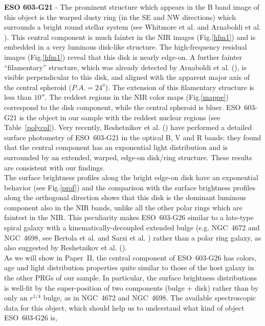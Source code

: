 \documentclass{aa}
\begin{document}
{\bf ESO 603-G21} -
The prominent structure which appears in the B band image of this object 
is the warped dusty ring (in the SE and NW directions) which
surrounds a bright round stellar system (see Whitmore et al. \cite{PRC} and
Arnaboldi et al. \cite{magda95}). 
This central component is much fainter in the NIR images (Fig.\ref{hfm1}) and 
is embedded in a very luminous disk-like structure. The
high-frequency residual images (Fig.\ref{hfm1}) reveal that this disk is 
nearly edge-on. 
A further fainter ``filamentary'' structure, which was already detected by 
Arnaboldi et al. (\cite{magda95}), is visible perpendicular to this 
disk, and aligned with the apparent major axis of the central 
spheroid ($P.A.=24^o$). The extension of this filamentary structure
is less than $10''$.
The reddest regions in the NIR color maps 
(Fig.\ref{mappe}) correspond to the disk component, while 
the central spheroid is bluer. ESO~603-G21 is the object in our sample
with the reddest nuclear regions (see Table~\ref{polycol}). 
Very recently, Reshetnikov et al. (\cite{Resh02}) have performed a detailed
surface photometry of ESO~603-G21 in the optical B, V and R bands: 
they found that the central component has an exponential light 
distribution and is surrounded by an extended, warped, edge-on disk/ring
structure. 
These results are consistent with our findings.\\
The surface brightness profiles along the bright edge-on disk have an 
exponential behavior (see Fig.\ref{prof}) and the comparison 
with the surface brightness profiles along the orthogonal direction shows that
this disk is the dominant luminous component also in the NIR bands, 
unlike all the other polar rings which are faintest in the NIR. 
This peculiarity makes ESO~603-G26 similar to a late-type spiral galaxy with a 
kinematically-decoupled extended bulge (e.g. NGC~4672 and NGC~4698, see
Bertola et al. \cite{bertola99} and Sarzi et al. \cite{sarzi2000}) rather
than a polar ring galaxy, as also suggested by Reshetnikov et
al. (\cite{Resh02}).  \\
As we will show in Paper~II, the central component of ESO~603-G26 has
colors, age and light distribution properties quite similar to those of
the host galaxy in the other PRGs of our sample. In particular, the
surface brightness distributions is well-fit by the super-position of
two components (bulge + disk) rather than by only an $r^{1/4}$ bulge,
as in NGC~4672 and NGC~4698. The available spectroscopic data for 
this object, which should help us to understand what kind of  
object ESO~603-G26 is,
\end{document}
